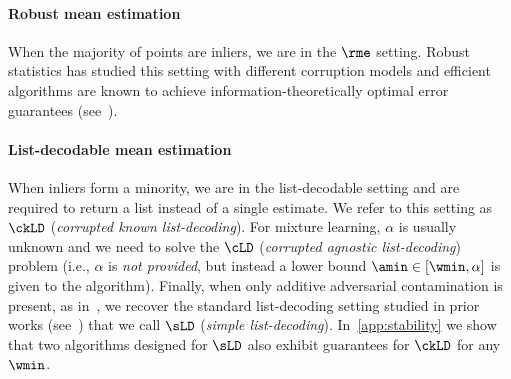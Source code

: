 \paragraph{Robust mean estimation}

When the majority of points are inliers, we are in the \(\rme\) setting. Robust statistics has studied this setting with different corruption models and efficient algorithms are known to achieve information-theoretically optimal error guarantees (see~).
\paragraph{List-decodable mean estimation}
When inliers form a minority, we are in the list-decodable setting and are required to return a list instead of a single estimate. 
We refer to this setting as \(\ckLD\) (\textit{corrupted known list-decoding}). For mixture learning, $\alpha$ is usually unknown and we need to solve the \(\cLD\) (\emph{corrupted agnostic list-decoding}) problem (i.e., \(\alpha\) is \emph{not provided}, but instead a lower bound \(\amin \in [\wmin, \alpha]\) is given to the algorithm).
Finally, when only additive adversarial contamination is present, as in~, 
we recover the standard list-decoding setting studied in prior works (see~) that we call \(\sLD\) (\textit{simple list-decoding}).
In~\cref{app:stability} we show that two
algorithms designed for \(\sLD\) also exhibit guarantees for \(\ckLD\) for any $\wmin$. 
